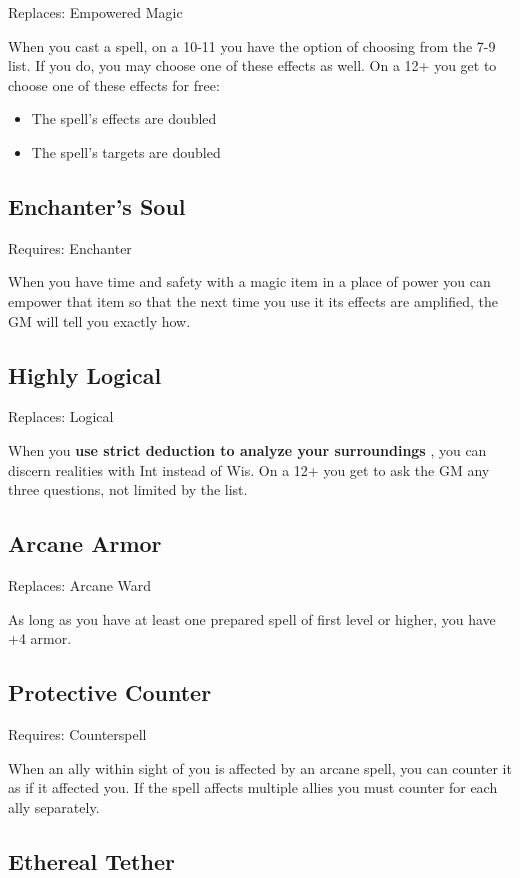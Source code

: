  Replaces: Empowered Magic


 When you cast a spell, on a 10-11 you have the option of choosing from the 7-9 list. If you do, you may choose one of these effects as well. On a 12+ you get to choose one of these effects for free:
\begin{itemize}
\item The spell's effects are doubled
\item The spell's targets are doubled

\end{itemize}
\subsection{Enchanter's Soul}


 Requires: Enchanter


 When you have time and safety with a magic item in a place of power you can empower that item so that the next time you use it its effects are amplified, the GM will tell you exactly how.
\subsection{Highly Logical}


 Replaces: Logical


 When you \textbf{use strict deduction to analyze your surroundings}
, you can discern realities with Int instead of Wis. On a 12+ you get to ask the GM any three questions, not limited by the list.
\subsection{Arcane Armor}


 Replaces: Arcane Ward


 As long as you have at least one prepared spell of first level or higher, you have +4 armor.
\subsection{Protective Counter}


 Requires: Counterspell


 When an ally within sight of you is affected by an arcane spell, you can counter it as if it affected you. If the spell affects multiple allies you must counter for each ally separately.
\subsection{Ethereal Tether}


